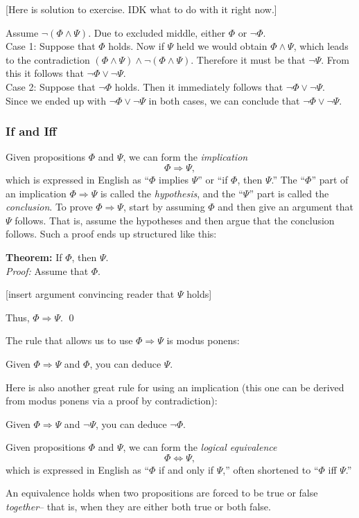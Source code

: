 \documentclass[12pt]{article}
\newcommand{\note}[1]{[#1]}
\newcommand{\AND}{\wedge}
\newcommand{\OR}{\vee}
\newcommand{\ARR}{\Rightarrow}
\newcommand{\DARR}{\Leftrightarrow}
\newcommand{\indented}[1]{\begin{adjustwidth}{1em}{}#1\end{adjustwidth}}
\newcommand{\THM}[2]{\textbf{Theorem:} #1\\[0.5em]\textit{Proof:} #2\qed}
\newcommand{\RULE}[2]{\begin{tcolorbox}[title=Rule: #1,colbacktitle=white,coltitle=black,colback=white]#2\end{tcolorbox}}
\newcommand{\DRULE}[2]{\begin{tcolorbox}[title=Derived Rule: #1,colbacktitle=white,coltitle=black,colback=white]#2\end{tcolorbox}} %
\def\pA{\Phi}
\def\pB{\Psi}
\begin{document}
\note{Here is solution to exercise. IDK what to do with it right now.}

Assume $\neg(\pA\AND\pB)$.
Due to excluded middle, either $\pA$ or $\neg\pA$.\\[0.5em]
Case 1: Suppose that $\pA$ holds. Now if $\pB$ held we would obtain $\pA\AND\pB$, which leads to the contradiction $(\pA\AND\pB)\AND\neg(\pA\AND\pB)$.
Therefore it must be that $\neg\pB$. From this it follows that $\neg\pA\OR\neg\pB$.\\[0.5em]
Case 2: Suppose that $\neg\pA$ holds. Then it immediately follows that $\neg\pA\OR\neg\pB$.\\[0.5em]
Since we ended up with $\neg\pA\OR\neg\pB$ in both cases, we can conclude that $\neg\pA\OR\neg\pB$.

\newpage


\subsubsection{If and Iff}

Given propositions $\pA$ and $\pB$, we can form the \emph{implication}
$$
\pA\ARR\pB,
$$
which is expressed in English as ``$\pA$ implies $\pB$'' or ``if $\pA$, then $\pB$.''
The ``$\pA$'' part of an implication $\pA\ARR\pB$ is called the \emph{hypothesis},
and the ``$\pB$'' part is called the \emph{conclusion}.
To prove $\pA\ARR\pB$,
start by assuming $\pA$ and
then give an argument that $\pB$ follows.
That is, assume the hypotheses and then argue that the conclusion follows.
Such a proof ends up structured like this:

\THM{If $\pA$, then $\pB$.}{
Assume that $\pA$.
\indented{[insert argument convincing reader that $\pB$ holds]}
Thus, $\pA\ARR\pB$.
}

The rule that allows us to use $\pA\ARR\pB$ is modus ponens:
\RULE{Modus ponens}{
Given $\pA\ARR\pB$ and $\pA$, you can deduce $\pB$.
}
Here is also another great rule for using an implication (this one can be derived from modus ponens via a proof by contradiction):
\DRULE{Modus tollens}{
Given $\pA\ARR\pB$ and $\neg\pB$, you can deduce $\neg\pA$.
}

Given  propositions $\pA$ and $\pB$, we can form the \emph{logical equivalence}
$$
\pA\DARR\pB,
$$
which is expressed in English as ``$\pA$ if and only if $\pB$,'' often shortened to ``$\pA$ iff $\pB$.''

An equivalence holds when two propositions are forced to be true or false \emph{together}--
that is, when they are either both true or both false.
\end{document}
